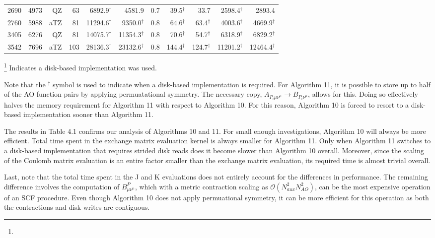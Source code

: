 \begin{table}[H]
\begin{tabular}{lrrrrrrrrrr}
2690& 4973&    QZ&    63&  6892.9$^{\dagger}$ &             4581.9&     0.7 &   39.5$^{\dagger}$ &               33.7&  2598.4$^{\dagger}$&              2893.4\\
2760& 5988&   aTZ&    81& 11294.6$^{\dagger}$ & 9350.0$^{\dagger}$&     0.8 &   64.6$^{\dagger}$ &   63.4$^{\dagger}$&  4003.6$^{\dagger}$&  4669.9$^{\dagger}$\\
3405& 6276&    QZ&    81& 14075.7$^{\dagger}$ &11354.3$^{\dagger}$&     0.8 &   70.6$^{\dagger}$ &   54.7$^{\dagger}$&  6318.9$^{\dagger}$&  6829.2$^{\dagger}$\\
3542& 7696&   aTZ&   103& 28136.3$^{\dagger}$ &23132.6$^{\dagger}$&     0.8 &  144.4$^{\dagger}$ &  124.7$^{\dagger}$& 11201.2$^{\dagger}$& 12464.4$^{\dagger}$\\

\hline
\end{tabular}
\renewcommand{\thefootnote}{\fnsymbol{footnote}}
\footnote[2]{} Indicates a disk-based implementation was used.
\end{table}
\endgroup

Note that the $^{\dagger}$ symbol is used to indicate when a disk-based implementation is required. For Algorithm 11, it is possible
to store up to half of the AO function pairs by applying permuatational symmetry. The necessary copy, 
$A_{P_i \mu \nu^{\mu}} \rightarrow B_{P_i \nu^{\mu}}$, allows for this. Doing so effectively halves the memory requirement for Algorithm 11
with respect to Algorithm 10. For this reason, Algorithm 10 is forced to resort to a disk-based implementation sooner than Algorithm 11.

The results in Table 4.1 confirms our analysis of Algorithms 10 and 11. For small enough investigations, Algorithm 10 will always be more
efficient. Total time spent in the exchange matrix evaluation kernel is always smaller for Algorithm 11. Only when Algorithm 11 switches to 
a disk-based implementation that requires strided disk reads does it become slower than Algorithm 10 overall. Moreover, since the scaling of
the Coulomb matrix evaluation is an entire factor smaller than the exchange matrix evaluation, its required time is almost trivial overall.

Last, note that the total time spent in the J and K evaluations does not entirely account for the differences in performance. The 
remaining difference involves the computation of $B^P_{\mu \nu^\mu}$, which with a metric contraction scaling as 
$\mathcal{O}(N_{aux}^2N_{AO}^2)$, can be the most expensive operation of an SCF procedure. Even though Algorithm 10 does not 
apply permuational symmetry, it can be more efficient for this operation as both the contractions and disk writes are contiguous.
 



